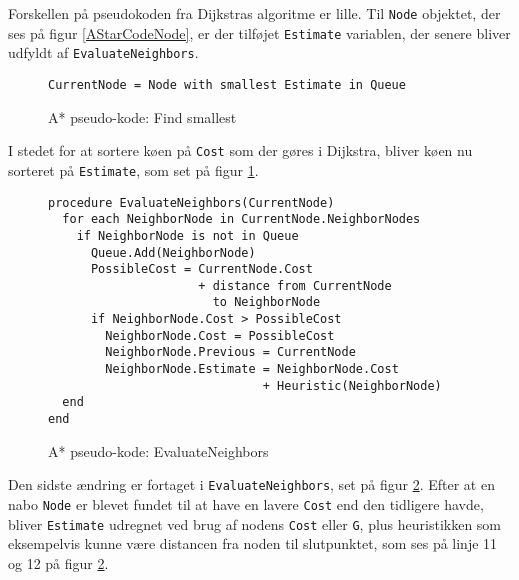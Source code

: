 Forskellen på pseudokoden fra Dijkstras algoritme er lille. Til \texttt{Node} objektet, der ses på figur \ref{AStarCodeNode}, er der tilføjet \texttt{Estimate} variablen, der senere bliver udfyldt af \texttt{EvaluateNeighbors}.

\begin{figure}[H]
\begin{lstlisting}
CurrentNode = Node with smallest Estimate in Queue
\end{lstlisting}
\caption{A* pseudo-kode: Find smallest}\label{AStarCodeFindSmallest}
\end{figure}

I stedet for at sortere køen på \texttt{Cost} som der gøres i Dijkstra, bliver køen nu sorteret på \texttt{Estimate}, som set på figur \ref{AStarCodeFindSmallest}.

\begin{figure}[H]
\begin{lstlisting}
procedure EvaluateNeighbors(CurrentNode)
  for each NeighborNode in CurrentNode.NeighborNodes
    if NeighborNode is not in Queue
      Queue.Add(NeighborNode)
      PossibleCost = CurrentNode.Cost 
                     + distance from CurrentNode
                       to NeighborNode
      if NeighborNode.Cost > PossibleCost
        NeighborNode.Cost = PossibleCost
        NeighborNode.Previous = CurrentNode
        NeighborNode.Estimate = NeighborNode.Cost
                              + Heuristic(NeighborNode)
  end
end
\end{lstlisting}
\caption{A* pseudo-kode: EvaluateNeighbors}\label{AStarCodeEvaluateNeighbors}
\end{figure}

Den sidste ændring er fortaget i \texttt{EvaluateNeighbors}, set på figur \ref{AStarCodeEvaluateNeighbors}. Efter at en nabo \texttt{Node} er blevet fundet til at have en lavere \texttt{Cost} end den tidligere havde, bliver \texttt{Estimate} udregnet ved brug af nodens \texttt{Cost} eller \texttt{G}, plus heuristikken som eksempelvis kunne være distancen fra noden til slutpunktet, som ses på linje 11 og 12 på figur \ref{AStarCodeEvaluateNeighbors}.